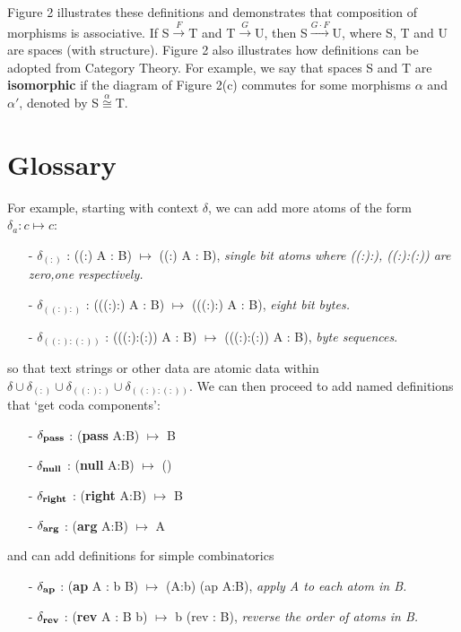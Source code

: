 \documentclass[11pt]{article}
\begin{document}
Figure 2 illustrates these definitions and demonstrates that composition of morphisms is associative.  If S${\overset F\longrightarrow}$T and T${\overset G\longrightarrow}$U, then S${\overset {G\cdot F} \longrightarrow}$U, where S, T and U are spaces (with structure).  Figure 2 also illustrates how 
definitions can be adopted from Category Theory.  For example, we say that spaces S and T are {\bf isomorphic} if the diagram of Figure 2(c) commutes for some morphisms $\alpha$ and $\alpha'$, denoted by S${\overset \alpha \cong}$T.  

\section{Glossary}

For example, starting with context $\delta$, we can add more atoms of the form $\delta_a:c\mapsto c$:
\begin{enumerate}
\item[-]{$\delta_{(:)}$ : ((:) A : B) $\mapsto$ ((:) A : B), {\it single bit atoms where ((:):), ((:):(:)) are zero,one respectively.}}
\item[-]{$\delta_{((:):)}$ : (((:):) A : B) $\mapsto$ (((:):) A : B), {\it eight bit bytes.}}
\item[-]{$\delta_{((:):(:))}$ : (((:):(:)) A : B) $\mapsto$ (((:):(:)) A : B), {\it byte sequences}.}
\end{enumerate}
so that text strings or other data are atomic data within $\delta\cup\delta_{(:)}\cup\delta_{((:):)}\cup\delta_{((:):(:))}$.  We can then proceed to add named 
definitions that `get coda components':
\begin{enumerate}
\item[-]{$\delta_{\bf pass}$ : ({\bf pass} A:B) $\mapsto$ B}
\item[-]{$\delta_{\bf null}$ : ({\bf null} A:B) $\mapsto$ ()}
\item[-]{$\delta_{\bf right}$ : ({\bf right} A:B) $\mapsto$ B} 
\item[-]{$\delta_{\bf arg}$ : ({\bf arg} A:B) $\mapsto$ A} 
\end{enumerate}
and can add definitions for simple combinatorics 
\begin{enumerate}
\item[-]{$\delta_{\bf ap}$ : ({\bf ap} A : b B) $\mapsto$ (A:b) (ap A:B), {\it apply A to each atom in B.}}
\item[-]{$\delta_{\bf rev}$ : ({\bf rev} A : B b) $\mapsto$ b (rev : B), {\it reverse the order of atoms in B.}}
\end{enumerate}
\end{document}
